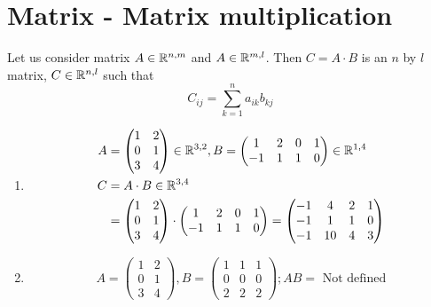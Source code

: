 \section{Matrix - Matrix multiplication}
\begin{definition}
Let us consider matrix $A\in\mathbb{R}^{n,m}$ and $A\in\mathbb{R}^{m,l}$. Then $C = A\cdot B$ is an $n$ by $l$ matrix, $C\in\mathbb{R}^{n,l}$ such that 
\[
C_{ij} = \sum\limits^{n}_{k=1}a_{ik}b_{kj}
\]
\end{definition}
\begin{example}
\begin{enumerate}
\item \begin{align*}
A&= \begin{pmatrix}
1 & 2\\
0 & 1\\
3 & 4
\end{pmatrix}\in\mathbb{R}^{3,2}, B = \begin{pmatrix}
1 & 2 & 0 & 1\\
-1 & 1 & 1 & 0
\end{pmatrix}\in\mathbb{R}^{1,4}\\
C &= A\cdot B\in\mathbb{R}^{3,4}\\
&= \begin{pmatrix}
1 & 2\\
0 & 1\\
3 & 4
\end{pmatrix}\cdot \begin{pmatrix}
1 & 2 & 0 & 1\\
-1 & 1 & 1 & 0
\end{pmatrix} = \begin{pmatrix}
-1 & 4 & 2 & 1\\
-1 & 1 & 1 & 0\\
-1 & 10 & 4 & 3
\end{pmatrix}
\end{align*}
\item 
\[
A = \begin{pmatrix}
1 & 2 \\ 
0 & 1\\
3 & 4
\end{pmatrix}, B = \begin{pmatrix}
1 & 1 & 1\\
0 & 0 & 0\\
2 & 2 & 2
\end{pmatrix}; AB = \text{ Not defined}
\]
\end{enumerate}
\end{example}

